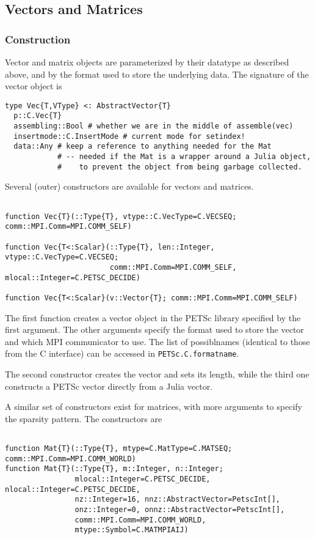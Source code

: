 \documentclass{article}
\newcommand{\ttt}{\texttt}
\begin{document}
\subsection{Vectors and Matrices} \label{sec:arrays}
\subsubsection{Construction}
Vector and matrix objects are parameterized by their datatype as described above, and by the format used to store the underlying data.
The signature of the vector object is

\begin{verbatim}
type Vec{T,VType} <: AbstractVector{T}
  p::C.Vec{T}
  assembling::Bool # whether we are in the middle of assemble(vec)
  insertmode::C.InsertMode # current mode for setindex!
  data::Any # keep a reference to anything needed for the Mat
            # -- needed if the Mat is a wrapper around a Julia object,
            #    to prevent the object from being garbage collected.

\end{verbatim}

Several (outer) constructors are available for vectors and matrices.
\begin{verbatim}

function Vec{T}(::Type{T}, vtype::C.VecType=C.VECSEQ; comm::MPI.Comm=MPI.COMM_SELF)

function Vec{T<:Scalar}(::Type{T}, len::Integer, vtype::C.VecType=C.VECSEQ;
                        comm::MPI.Comm=MPI.COMM_SELF, mlocal::Integer=C.PETSC_DECIDE)

function Vec{T<:Scalar}(v::Vector{T}; comm::MPI.Comm=MPI.COMM_SELF)
\end{verbatim}

The first function creates a vector object in the PETSc library specified by the first argument.
The other arguments specify the format used to store the vector and which MPI communicator to use.
The list of possiblnames (identical to those from the C interface) can be accessed in \ttt{PETSc.C.formatname}.

The second constructor creates the vector and sets its length, while the third one constructs a PETSc vector directly from a Julia vector.

A similar set of constructors exist for matrices, with more arguments to specify the sparsity pattern.
The constructors are

\begin{verbatim}

function Mat{T}(::Type{T}, mtype=C.MatType=C.MATSEQ; comm::MPI.Comm=MPI.COMM_WORLD)
function Mat{T}(::Type{T}, m::Integer, n::Integer;
                mlocal::Integer=C.PETSC_DECIDE, nlocal::Integer=C.PETSC_DECIDE,
                nz::Integer=16, nnz::AbstractVector=PetscInt[],
                onz::Integer=0, onnz::AbstractVector=PetscInt[],
                comm::MPI.Comm=MPI.COMM_WORLD,
                mtype::Symbol=C.MATMPIAIJ)

\end{verbatim}
\end{document}
